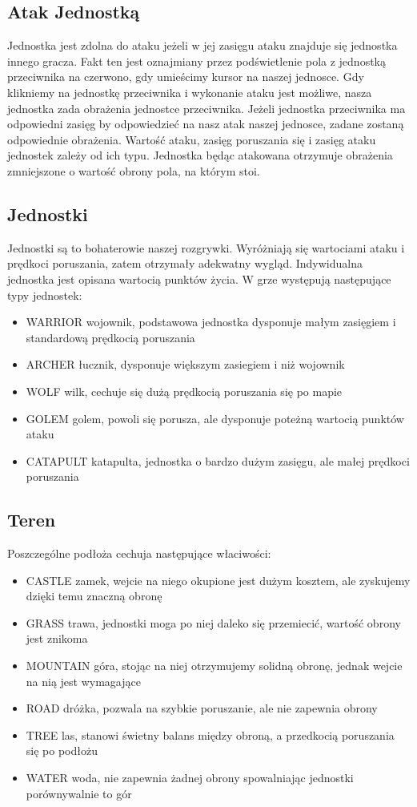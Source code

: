 \documentclass[paper=a4, fontsize=11pt]{scrartcl} %
\numberwithin{equation}{section} %
\numberwithin{figure}{section} %
\numberwithin{table}{section} %
\begin{document}
\subsection{Atak Jednostką}
Jednostka jest zdolna do ataku jeżeli w jej zasięgu ataku znajduje się jednostka innego gracza. Fakt ten jest oznajmiany przez podświetlenie pola z jednostką przeciwnika na czerwono, gdy umieścimy kursor na naszej jednosce. Gdy klikniemy na jednostkę przeciwnika i wykonanie ataku jest możliwe, nasza jednostka zada obrażenia jednostce przeciwnika. Jeżeli jednostka przeciwnika ma odpowiedni zasięg by odpowiedzieć na nasz atak naszej jednosce, zadane zostaną odpowiednie obrażenia. Wartość ataku, zasięg poruszania się i zasięg ataku jednostek zależy od ich typu. Jednostka będąc atakowana otrzymuje obrażenia zmniejszone o wartość obrony pola, na którym stoi.
\subsection{Jednostki}
Jednostki są to bohaterowie naszej rozgrywki. Wyróżniają się wartociami ataku i prędkoci poruszania, zatem otrzymały adekwatny wygląd. Indywidualna jednostka jest opisana wartocią punktów życia. W grze występują następujące typy jednostek:
\begin{itemize}
\item{WARRIOR} wojownik, podstawowa jednostka dysponuje małym zasięgiem i standardową prędkocią poruszania
\item{ARCHER} łucznik, dysponuje większym zasiegiem i niż wojownik
\item{WOLF} wilk, cechuje się dużą prędkocią poruszania się po mapie
\item{GOLEM} golem, powoli się porusza, ale dysponuje poteżną wartocią punktów ataku
\item{CATAPULT} katapulta, jednostka o bardzo dużym zasięgu, ale małej prędkoci poruszania
\end{itemize}

\subsection{Teren}
Poszczególne podłoża cechuja następujące właciwości:
\begin{itemize}
\item{CASTLE} zamek, wejcie na niego okupione jest dużym kosztem, ale zyskujemy dzięki temu znaczną obronę
\item{GRASS} trawa, jednostki moga po niej daleko się przemiecić, wartość obrony jest znikoma
\item{MOUNTAIN} góra, stojąc na niej otrzymujemy solidną obronę, jednak wejcie na nią jest wymagające
\item{ROAD} dróżka, pozwala na szybkie poruszanie, ale nie zapewnia obrony
\item{TREE} las, stanowi świetny balans między obroną, a przedkocią poruszania się po podłożu
\item{WATER} woda, nie zapewnia żadnej obrony spowalniając jednostki porównywalnie to gór
\end{itemize}
\end{document}
